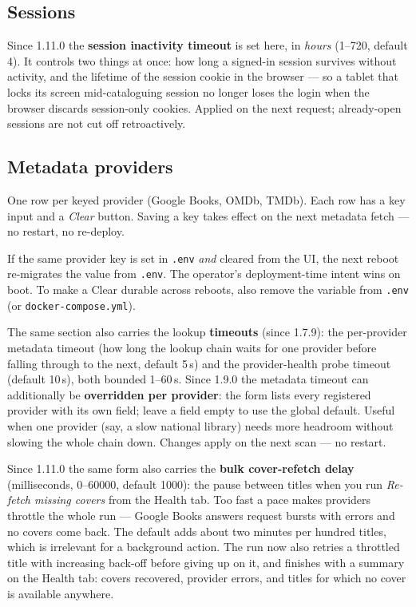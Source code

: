 \subsection*{Sessions}

Since 1.11.0 the \textbf{session inactivity timeout} is set here, in
\emph{hours} (1--720, default 4). It controls two things at once: how
long a signed-in session survives without activity, and the lifetime
of the session cookie in the browser — so a tablet that locks its
screen mid-cataloguing session no longer loses the login when the
browser discards session-only cookies. Applied on the next request;
already-open sessions are not cut off retroactively.

\subsection*{Metadata providers}

One row per keyed provider (Google Books, OMDb, TMDb). Each row has
a key input and a \emph{Clear} button. Saving a key takes effect on
the next metadata fetch — no restart, no re-deploy.

\begin{note}
If the same provider key is set in \texttt{.env} \emph{and} cleared
from the UI, the next reboot re-migrates the value from
\texttt{.env}. The operator's deployment-time intent wins on boot.
To make a Clear durable across reboots, also remove the variable
from \texttt{.env} (or \texttt{docker-compose.yml}).
\end{note}

The same section also carries the lookup \textbf{timeouts} (since
1.7.9): the per-provider metadata timeout (how long the lookup chain
waits for one provider before falling through to the next, default
5\,s) and the provider-health probe timeout (default 10\,s), both
bounded 1--60\,s. Since 1.9.0 the metadata timeout can additionally be
\textbf{overridden per provider}: the form lists every registered
provider with its own field; leave a field empty to use the global
default. Useful when one provider (say, a slow national library) needs
more headroom without slowing the whole chain down. Changes apply on
the next scan — no restart.

Since 1.11.0 the same form also carries the \textbf{bulk
cover-refetch delay} (milliseconds, 0--60000, default 1000): the
pause between titles when you run \emph{Re-fetch missing covers} from
the Health tab. Too fast a pace makes providers throttle the whole
run — Google Books answers request bursts with errors and no covers
come back. The default adds about two minutes per hundred titles,
which is irrelevant for a background action. The run now also retries
a throttled title with increasing back-off before giving up on it,
and finishes with a summary on the Health tab: covers recovered,
provider errors, and titles for which no cover is available anywhere.

